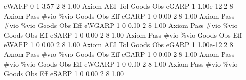        eWARP {\VBAR}    0           1        3.57           2           8        1.00  
{\smallskip}
       Axiom {\VBAR}       AEI        Tol      Goods        Obs 
       eGARP {\VBAR}         1   1.00e-12          2          8 
{\smallskip}
{\smallskip}
{\smallskip}
       Axiom {\VBAR} Pass        \#vio        \%vio       Goods         Obs         Eff  
       eGARP {\VBAR}    1           0        0.00           2           8        1.00  
{\smallskip}
{\smallskip}
{\smallskip}
       Axiom {\VBAR} Pass        \#vio        \%vio       Goods         Obs         Eff  
      eWGARP {\VBAR}    1           0        0.00           2           8        1.00  
{\smallskip}
{\smallskip}
{\smallskip}
       Axiom {\VBAR} Pass        \#vio        \%vio       Goods         Obs         Eff  
       eSARP {\VBAR}    1           0        0.00           2           8        1.00  
{\smallskip}
{\smallskip}
{\smallskip}
       Axiom {\VBAR} Pass        \#vio        \%vio       Goods         Obs         Eff  
       eWARP {\VBAR}    1           0        0.00           2           8        1.00  
{\smallskip}
       Axiom {\VBAR}       AEI        Tol      Goods        Obs 
       eGARP {\VBAR}         1   1.00e-12          2          8 
{\smallskip}
{\smallskip}
{\smallskip}
       Axiom {\VBAR} Pass        \#vio        \%vio       Goods         Obs         Eff  
       eGARP {\VBAR}    1           0        0.00           2           8        1.00  
{\smallskip}
{\smallskip}
{\smallskip}
       Axiom {\VBAR} Pass        \#vio        \%vio       Goods         Obs         Eff  
      eWGARP {\VBAR}    1           0        0.00           2           8        1.00  
{\smallskip}
{\smallskip}
{\smallskip}
       Axiom {\VBAR} Pass        \#vio        \%vio       Goods         Obs         Eff  
       eSARP {\VBAR}    1           0        0.00           2           8        1.00  
{\smallskip}
